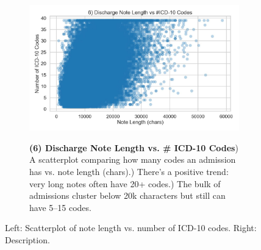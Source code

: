 \begin{figure}[ht!]
    \centering
    \begin{subfigure}{0.42\textwidth}
        \includegraphics[width=\linewidth]{mimic_plots/plot6.jpg}
    \end{subfigure}\hfill
    \begin{subfigure}{0.54\textwidth}
        \footnotesize
        \textbf{(6) Discharge Note Length vs. \# ICD-10 Codes}) A scatterplot comparing how many codes an admission has vs. note length (chars).) There's a positive trend: very long notes often have 20+ codes.) The bulk of admissions cluster below 20k characters but still can have 5--15 codes.
    \end{subfigure}
    \caption{Left: Scatterplot of note length vs. number of ICD-10 codes. Right: Description.}
    \label{fig:plot6}
\end{figure}

